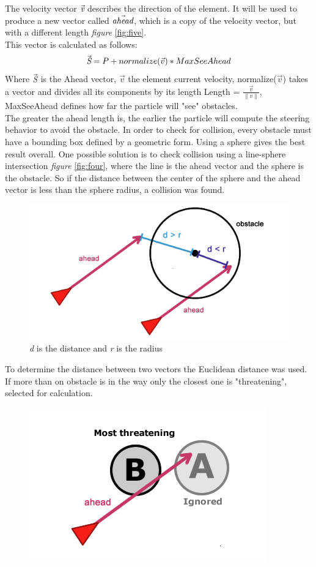The velocity vector $\vec{\emph{v}}$ describes the direction of the element. It will be used to produce a new vector called $\vec{\emph{ahead}}$, which is a copy of the velocity vector, but with a different length \emph{figure} \ref{fig:five}.\\

This vector is calculated as follows:
\begin{equation}
\vec{\emph{S}} = P + normalize(\vec{v}) * MaxSeeAhead
\end{equation}
Where $\vec{\emph{S}}$ is the Ahead vector, $\vec{v}$ the element current velocity, normalize($\vec{v}$) takes a vector and divides all its components by its length Length = $\frac{\vec{v}}{\lVert v \rVert}$, MaxSeeAhead defines how far the particle will "see" obstacles.\\
The greater the ahead length is, the earlier the particle will compute the steering behavior to avoid the obstacle.
In order to check for collision, every obstacle must have a bounding box defined by a geometric form. Using a sphere gives the best result overall. One possible solution is to check collision using a line-sphere intersection \emph{figure} \ref{fig:four}, where the line is the ahead vector and the sphere is the obstacle. So if the distance between the center of the sphere and the ahead vector is less than the sphere radius, a collision was found.
\begin{figure}
 	\includegraphics[scale=0.5]{collision}
 	\caption{\emph{d} is the distance and \emph{r} is the radius}
 	\label{fig:six}
\end{figure}
To determine the distance between two vectors the Euclidean distance was used. If more than on obstacle is in the way only the closest one is "threatening", selected for calculation.
\begin{figure}[H]
	\includegraphics[scale=0.5]{Threat}
	\caption{}
	\label{fig:seven}
\end{figure}
